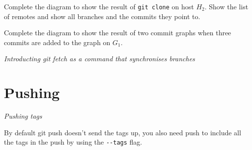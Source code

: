 

\begin{example}
  Complete the diagram to show the result 
  of \lstinline{git clone} on host $H_2$. 
  Show the list of remotes and show all branches and the commits they 
  point to.
\end{example}

\frmrule 


\begin{example}
  Complete the diagram to show the result of
  two commit graphs when three commits are added 
  to the graph on $G_1$. 
\end{example}

\frmrule 


\frmrule 

\textit{Introducting git fetch as a command that synchronises branches}





\frmrule 

\section{Pushing}








\frmrule 

\textit{Pushing tags}

By default git push doesn't send the tags up, you also need push 
to include all the tags in the push by using the \lstinline{--tags} flag.




\frmrule 

